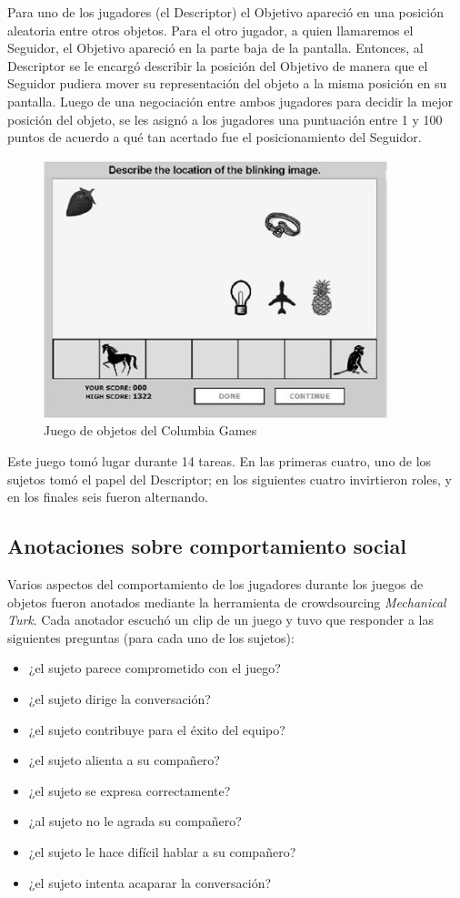 Para uno de los jugadores (el Descriptor) el Objetivo apareció en una posición aleatoria entre otros objetos. Para el otro jugador, a quien llamaremos el Seguidor, el Objetivo apareció en la parte baja de la pantalla. Entonces, al Descriptor se le encargó describir la posición del Objetivo de manera que el Seguidor pudiera mover su representación del objeto a la misma posición en su pantalla. Luego de una negociación entre ambos jugadores para decidir la mejor posición del objeto, se les asignó a los jugadores una puntuación entre 1 y 100 puntos de acuerdo a qué tan acertado fue el posicionamiento del Seguidor.

\begin{figure}[]
\centering
\includegraphics[width=10cm]{images/columbia_games.jpg}
\caption{Juego de objetos del Columbia Games}
\label{objects_game}
\end{figure}


Este juego tomó lugar durante 14 tareas. En las primeras cuatro, uno de los sujetos tomó el papel del Descriptor; en los siguientes cuatro invirtieron roles, y en los finales seis fueron alternando.

\subsection{Anotaciones sobre comportamiento social}

Varios aspectos del comportamiento de los jugadores durante los juegos de objetos fueron anotados mediante la herramienta de crowdsourcing \emph{Mechanical Turk}. Cada anotador escuchó un clip de un juego y tuvo que responder a las siguientes preguntas (para cada uno de los sujetos):

\begin{itemize}
  \item ¿el sujeto parece comprometido con el juego?
  \item ¿el sujeto dirige la conversación?
  \item ¿el sujeto contribuye para el éxito del equipo?
  \item ¿el sujeto alienta a su compañero?
  \item ¿el sujeto se expresa correctamente?
  \item ¿al sujeto no le agrada su compañero?
  \item ¿el sujeto le hace difícil hablar a su compañero?
  \item ¿el sujeto intenta acaparar la conversación?
\end{itemize}

